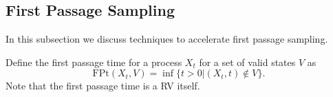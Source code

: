 \documentclass[a4paper,12pt]{article}
\begin{document}

\subsection{First Passage Sampling}

In this subsection we discuss techniques to accelerate first passage sampling.

\begin{definition} \label{def:first passage time}
    Define the first passage time for a process $X_{t}$ for a set of valid states
    $V$ as
    \begin{equation}
        \text{FPt}(X_{t},V)=\inf \{t>0| (X_{t},t) \notin V \}
        .
    \end{equation}
    Note that the first passage time is a RV itself.
\end{definition}
\end{document}
